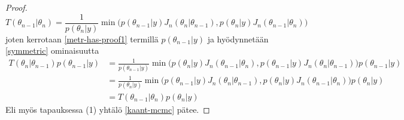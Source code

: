 \begin{proof}
	\begin{equation}\label{symmetric}
		T(\theta_{n-1}|\theta_{n})=\frac{1}{p(\theta_{n}|y)} \min \Big( p(\theta_{n-1}|y)J_n(\theta_{n}|\theta_{n-1}) , p(\theta_{n}|y)J_n(\theta_{n-1}|\theta_{n})  \Big)
	\end{equation}
	joten kerrotaan \ref{metr-has-proof1} termillä $p(\theta_{n-1}|y)$ ja hyödynnetään \ref{symmetric} ominaisuutta
	\begin{equation*}
	\begin{split}
		T(\theta_n|\theta_{n-1})p(\theta_{n-1}|y) &= \frac{1}{p(\theta_{n-1}|y)} \min \Big( p(\theta_n|y)J_n(\theta_{n-1}|\theta_n) , p(\theta_{n-1}|y)J_n(\theta_n|\theta_{n-1})  \Big) p(\theta_{n-1}|y) \\
		&= \frac{1}{p(\theta_{n}|y)} \min \Big( p(\theta_{n-1}|y)J_n(\theta_{n}|\theta_{n-1}) , p(\theta_{n}|y)J_n(\theta_{n-1}|\theta_{n})  \Big) p(\theta_{n}|y) \\
		&= T(\theta_{n-1}|\theta_{n})p(\theta_{n}|y)
	\end{split}
	\end{equation*}
	Eli myös tapauksessa (1) yhtälö \ref{kaant-mcmc} pätee.
\end{proof}

